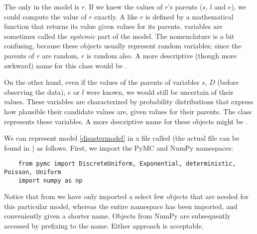 The only  in the model is $r$. If we knew the values of
$r$'s parents ($s$, $l$ and $e$), we could compute the value of $r$ exactly. A
 like $r$ is defined by a mathematical function that returns
its value given values for its parents.  variables are
sometimes called the \emph{systemic} part of the model. The nomenclature is a
bit confusing, because these objects usually represent random variables; since
the parents of $r$ are random, $r$ is random also. A more descriptive (though
more awkward) name for this class would be .

On the other hand, even if the values of the parents of variables $s$, $D$ (before observing the data), $e$ or $l$ were known, we would still be uncertain of their values. These variables are characterized by probability distributions that express how plausible their candidate values are, given values for their parents. The  class represents these variables. A more descriptive name for these objects might be .

We can represent model \ref{disastermodel} in a file called
 (the actual file can be found in
) as follows. First, we import the PyMC and NumPy
namespaces:
\begin{verbatim}
	from pymc import DiscreteUniform, Exponential, deterministic, Poisson, Uniform
	import numpy as np
\end{verbatim}
Notice that from  we have only imported a select few objects that are needed for this particular model, whereas the entire  namespace has been imported, and conveniently given a shorter name. Objects from NumPy are subsequently accessed by prefixing  to the name. Either approach is acceptable.

